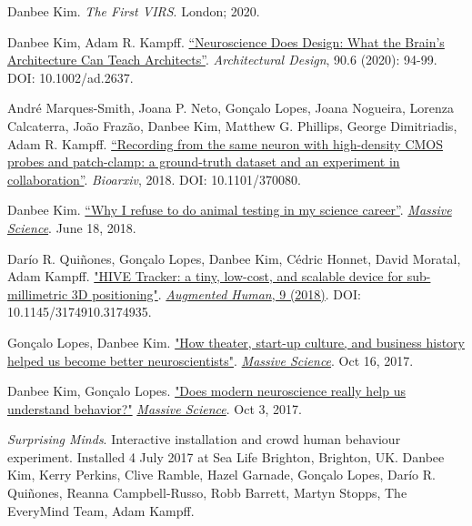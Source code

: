 \documentclass[]{friggeri-cv}
\begin{document}
\vspace{1.2mm}
Danbee Kim. \emph{The First VIRS}. London; 2020. 

\vspace{1.2mm}
Danbee Kim, Adam R. Kampff. \href{https://sci-hub.do/https://onlinelibrary.wiley.com/doi/abs/10.1002/ad.2637}{``Neuroscience Does Design: What the Brain's Architecture Can Teach Architects''}. \emph{Architectural Design}, 90.6 (2020): 94-99. DOI: 10.1002/ad.2637.

\vspace{1.2mm}
Andr\'{e} Marques-Smith, Joana P. Neto, Gon\c{c}alo Lopes, Joana Nogueira, Lorenza Calcaterra, Jo\~{a}o Fraz\~{a}o, Danbee Kim, Matthew G. Phillips, George Dimitriadis, Adam R. Kampff. \href{https://www.biorxiv.org/content/10.1101/370080v1}{``Recording from the same neuron with high-density CMOS probes and patch-clamp: a ground-truth dataset and an experiment in collaboration''}. \emph{Bioarxiv}, 2018. DOI: 10.1101/370080.

\vspace{1.2mm}
Danbee Kim. \href{https://massivesci.com/articles/frankenstein-kim-animal-testing/}{“Why I refuse to do animal testing in my science career”}. \emph{\href{https://massivesci.com}{Massive Science}}. June 18, 2018.

\vspace{1.2mm}
Dar\'{i}o R. Qui\~{n}ones, Gon\c{c}alo Lopes, Danbee Kim, C\'{e}dric Honnet, David Moratal, Adam Kampff. \href{https://www.researchgate.net/publication/322842913_HIVE_Tracker_a_tiny_low-cost_and_scalable_device_for_sub-millimetric_3D_positioning}{"HIVE Tracker: a tiny, low-cost, and scalable device for sub-millimetric 3D positioning"}. \href{http://www.sigah.org/AH2018/}{\emph{Augmented Human}, 9 (2018)}. DOI: 10.1145/3174910.3174935.

\vspace{1.2mm}
Gon\c{c}alo Lopes, Danbee Kim. \href{https://massivesci.com/articles/neuroscience-can-learn-from-theater/}{"How theater, start-up culture, and business history helped us become better neuroscientists"}. \emph{\href{https://massivesci.com}{Massive Science}}. Oct 16, 2017.

\vspace{1.2mm}
Danbee Kim, Gon\c{c}alo Lopes. \href{https://massivesci.com/articles/neuroscience-behavior-vs-technology/}{"Does modern neuroscience really help us understand behavior?"} \emph{\href{https://massivesci.com}{Massive Science}}. Oct 3, 2017. 

\vspace{1.2mm}
\emph{Surprising Minds}. Interactive installation and crowd human behaviour experiment. Installed 4 July 2017 at Sea Life Brighton, Brighton, UK. Danbee Kim, Kerry Perkins, Clive Ramble, Hazel Garnade, Gon\c{c}alo Lopes, Dar\'{i}o R. Qui\~{n}ones, Reanna Campbell-Russo, Robb Barrett, Martyn Stopps, The EveryMind Team, Adam Kampff.
\end{document}
